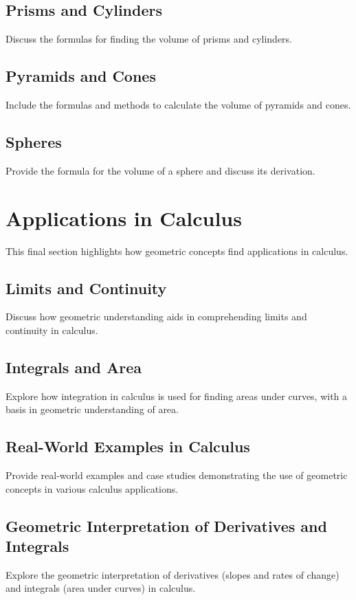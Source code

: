 \documentclass[a4paper,12pt]{book}
\begin{document}
\subsection{Prisms and Cylinders}
\label{subsec:volume_prisms_cylinders}
Discuss the formulas for finding the volume of prisms and cylinders.


\subsection{Pyramids and Cones}
\label{subsec:volume_pyramids_cones}
Include the formulas and methods to calculate the volume of pyramids and cones.


\subsection{Spheres}
\label{subsec:volume_spheres}
Provide the formula for the volume of a sphere and discuss its derivation.


\section{Applications in Calculus}
\label{sec:applications_in_calculus}
This final section highlights how geometric concepts find applications in calculus.


\subsection{Limits and Continuity}
\label{subsec:limits_and_continuity}
Discuss how geometric understanding aids in comprehending limits and continuity in calculus.


\subsection{Integrals and Area}
\label{subsec:integrals_and_area}
Explore how integration in calculus is used for finding areas under curves, with a basis in geometric understanding of area.

\subsection{Real-World Examples in Calculus}
\label{subsec:real_world_examples_calculus}
Provide real-world examples and case studies demonstrating the use of geometric concepts in various calculus applications.


\subsection{Geometric Interpretation of Derivatives and Integrals}
\label{subsec:geometric_interpretation_derivatives_integrals}
Explore the geometric interpretation of derivatives (slopes and rates of change) and integrals (area under curves) in calculus.
\end{document}
